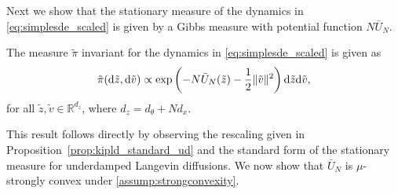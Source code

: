 Next we show that the stationary measure of the dynamics in \eqref{eq:simplesde_scaled} is given by a Gibbs measure with potential function $N\bar{U}_N$.
\begin{lemma}\label{lem:scaledstat}
The measure $\tilde{\pi}$ invariant for the dynamics in \eqref{eq:simplesde_scaled} is given as
\begin{equation}
\tilde{\pi}({\mathrm d} \tilde{z}, {\mathrm d} \tilde{v}) \propto \exp\left(-N\bar{U}_N(\tilde{z}) -\frac{1}{2}\|\tilde{v}\|^2\right){\mathrm d} \tilde{z} {\mathrm d} \tilde{v},
\end{equation}
for all $\tilde{z},\tilde{v}\in\mathbb{R}^{d_z}$, where $d_z=d_\theta+Nd_x$.
\end{lemma}

This result follows directly by observing the rescaling given in Proposition~\ref{prop:kipld_standard_ud} and the standard form of the stationary measure for underdamped Langevin diffusions. We now show that $\bar{U}_N$ is $\mu$-strongly convex under \ref{assump:strongconvexity}.

